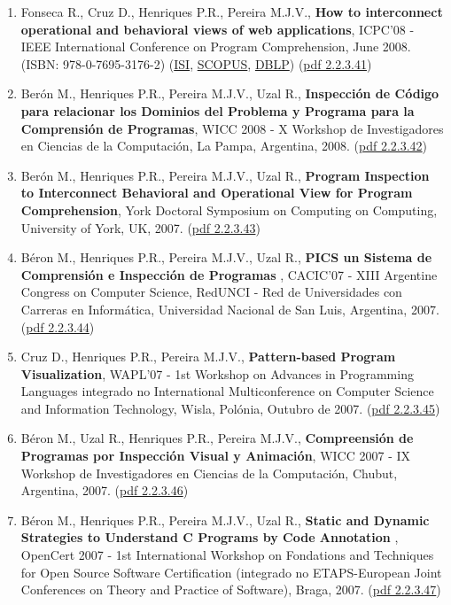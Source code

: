 \documentclass[11pt]{article}
\begin{document}
\begin{enumerate}
\item {Fonseca R., Cruz D., Henriques P.R., Pereira M.J.V., {\bf{ How to interconnect operational and behavioral views of web applications}}, ICPC'08 - IEEE International Conference on Program Comprehension, June 2008. (ISBN: 978-0-7695-3176-2) (\href{run:Publicacoes/ComprovativosISI.pdf}{ISI}, \href{run:Publicacoes/PublicacoesSCOPUS.pdf}{SCOPUS}, \href{run:Publicacoes/ComprovativosDBLP.pdf}{DBLP}) (\href{run:Publicacoes/publicacoes/38.pdf}{pdf 2.2.3.41})}
\item {Berón M., Henriques P.R., Pereira M.J.V., Uzal R., {\bf{ Inspección de Código para relacionar los Dominios del Problema y Programa para la Comprensión de Programas}}, WICC 2008 - X Workshop de Investigadores en Ciencias de la Computación, La Pampa, Argentina, 2008. (\href{run:Publicacoes/publicacoes/32.pdf}{pdf 2.2.3.42})}
\item {Berón M., Henriques P.R., Pereira M.J.V., Uzal R., {\bf{ Program Inspection to Interconnect Behavioral and Operational View for Program Comprehension}}, York Doctoral Symposium on Computing on Computing, University of York, UK, 2007. (\href{run:Publicacoes/publicacoes/28.pdf}{pdf 2.2.3.43})}
\item {Béron M., Henriques P.R., Pereira M.J.V., Uzal R., {\bf{ PICS un Sistema de Comprensión e Inspección de Programas}} , CACIC'07 - XIII Argentine Congress on Computer Science, RedUNCI - Red de Universidades con Carreras en Informática, Universidad Nacional de San Luis, Argentina, 2007. (\href{run:Publicacoes/publicacoes/22.pdf}{pdf 2.2.3.44})}
\item {Cruz D., Henriques P.R., Pereira M.J.V., {\bf{ Pattern-based Program Visualization}}, WAPL'07 - 1st Workshop on Advances in Programming Languages integrado no International Multiconference on Computer Science and Information Technology, Wisla, Polónia, Outubro de 2007. (\href{run:Publicacoes/publicacoes/21.pdf}{pdf 2.2.3.45})}
\item {Béron M., Uzal R., Henriques P.R., Pereira M.J.V., {\bf{ Compreensión de Programas por Inspección Visual y Animación}}, WICC 2007 - IX Workshop de Investigadores en Ciencias de la Computación, Chubut, Argentina, 2007. (\href{run:Publicacoes/publicacoes/27.pdf}{pdf 2.2.3.46})}
\item {Béron M., Henriques P.R., Pereira M.J.V., Uzal R., {\bf{ Static and Dynamic Strategies to Understand C Programs by Code Annotation}} , OpenCert 2007 - 1st International Workshop on Fondations and Techniques for Open Source Software Certification (integrado no ETAPS-European Joint Conferences on Theory and Practice of Software), Braga, 2007. (\href{run:Publicacoes/publicacoes/24.pdf}{pdf 2.2.3.47})}

\end{enumerate}
\end{document}
